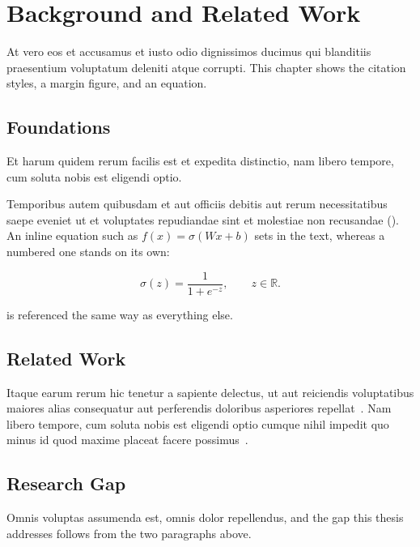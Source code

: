 \chapter{Background and Related Work}
\label{chap:background}

At vero eos et accusamus et iusto odio dignissimos ducimus qui blanditiis praesentium voluptatum deleniti atque corrupti.
This chapter shows the citation styles, a margin figure, and an equation.

\section{Foundations}
\label{sec:bg-foundations}

Et harum quidem rerum facilis est et expedita distinctio, nam libero tempore, cum soluta nobis est eligendi optio.

\begin{marginfigure}
  \centering
  \caption[A figure in the margin]{A margin figure, drawn with TikZ so it inherits the thesis colours. It is centred on the line that introduces it.}
  \label{fig:bg-margin}
\end{marginfigure}

Temporibus autem quibusdam et aut officiis debitis aut rerum necessitatibus saepe eveniet ut et voluptates repudiandae sint et molestiae non recusandae ().
An inline equation such as \(f(x) = \sigma(Wx + b)\) sets in the text, whereas a numbered one stands on its own:

\begin{equation}
  \label{eq:bg-sigmoid}
  \sigma(z) = \frac{1}{1 + e^{-z}}, \qquad z \in \mathbb{R}.
\end{equation}

 is referenced the same way as everything else.

\section{Related Work}
\label{sec:bg-related}

Itaque earum rerum hic tenetur a sapiente delectus, ut aut reiciendis voluptatibus maiores alias consequatur aut perferendis doloribus asperiores repellat~\cite{example_Preprint_2025,example_Website_2026}.
Nam libero tempore, cum soluta nobis est eligendi optio cumque nihil impedit quo minus id quod maxime placeat facere possimus~\cite{example_ConferencePaper_2024}.

\section{Research Gap}
\label{sec:bg-gap}

Omnis voluptas assumenda est, omnis dolor repellendus, and the gap this thesis addresses follows from the two paragraphs above.
